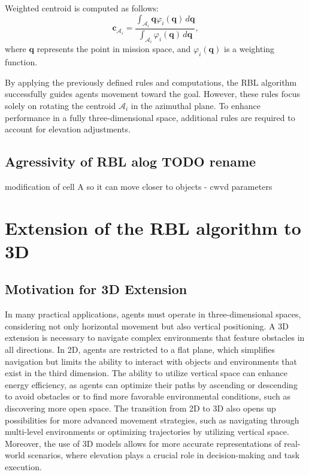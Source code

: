         Weighted centroid is computed as follows:        
        \begin{equation}
            \mathbf{c}_{\mathcal{A}_i} = \frac{\int_{\mathcal{A}_i} \mathbf{q} \varphi_i(\mathbf{q}) \, d\mathbf{q}}{\int_{\mathcal{A}_i} \varphi_i(\mathbf{q}) \, d\mathbf{q}},
        \end{equation}
        where \( \mathbf{q} \) represents the point in mission space, and \( \varphi_i(\mathbf{q}) \) is a weighting function. 

        By applying the previously defined rules and computations, the RBL algorithm successfully guides agents movement toward the goal.
        However, these rules focus solely on rotating the centroid $\mathcal{A}_i$ in the azimuthal plane. 
        To enhance performance in a fully three-dimensional space, additional rules are required to account for elevation adjustments. 
    \subsection{Agressivity of RBL alog TODO rename}
        modification of cell A so it can move closer to objects - cwvd parameters

\section{Extension of the RBL algorithm to 3D}
    \subsection{Motivation for 3D Extension}
        In many practical applications, agents must operate in three-dimensional spaces, considering not only horizontal movement but also vertical positioning.
        A 3D extension is necessary to navigate complex environments that feature obstacles in all directions.
        In 2D, agents are restricted to a flat plane, which simplifies navigation but limits the ability to interact with objects and environments that exist in the third dimension.
        The ability to utilize vertical space can enhance energy efficiency, as agents can optimize their paths by ascending or descending to avoid obstacles or to find more favorable environmental conditions, such as discovering more open space.
        The transition from 2D to 3D also opens up possibilities for more advanced movement strategies, such as navigating through multi-level environments or optimizing trajectories by utilizing vertical space.  
        Moreover, the use of 3D models allows for more accurate representations of real-world scenarios, where elevation plays a crucial role in decision-making and task execution.


